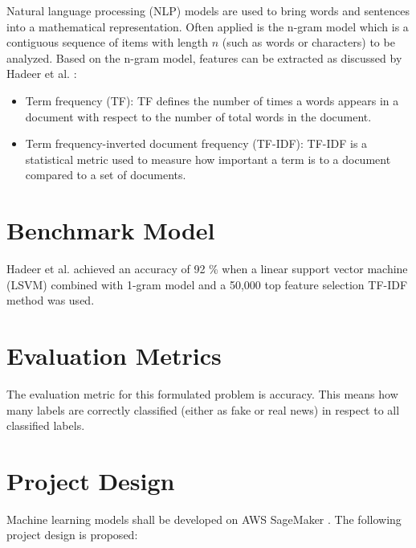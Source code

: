 \documentclass[a4paper,12pt,nottoc]{article}
\begin{document}
Natural language processing (NLP) models are used to bring words and sentences into a mathematical representation. Often applied is the n-gram model which is a contiguous sequence of items with length $n$ (such as words or characters) to be analyzed. Based on the n-gram model, features can be extracted as discussed by Hadeer et al. \cite{bib:ahmed-2018}:
 
 \begin{itemize}
\item{Term frequency (TF): TF defines the number of times a words appears in a document with respect to the number of total words in the document.}
\item{Term frequency-inverted document frequency (TF-IDF): TF-IDF is a statistical metric used to measure how important a term is to a document compared to a set of documents.}
\end{itemize}

\section*{Benchmark Model}

Hadeer et al. \cite{bib:ahmed-2017} achieved an accuracy of 92 \% when a linear support vector machine (LSVM) combined with 1-gram model and a 50,000 top feature selection TF-IDF method was used.

\section*{Evaluation Metrics}

The evaluation metric for this formulated problem is accuracy. This means how many labels are correctly classified (either as fake or real news) in respect to all classified labels.

\section*{Project Design}

Machine learning models shall be developed on AWS SageMaker \cite{bib:sagemaker}. The following project design is proposed:
\end{document}
